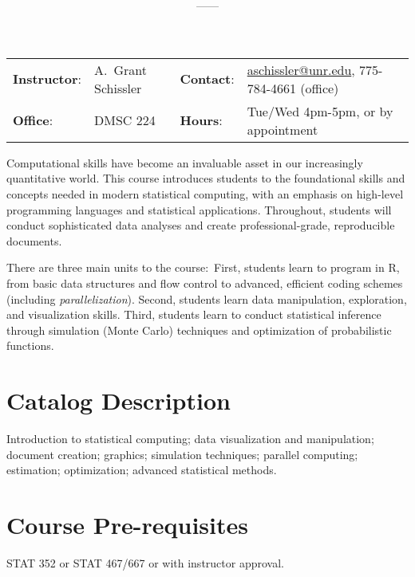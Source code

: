 \documentclass[11pt,onecolumn]{article}
\title{\textbf{\coursename}}
\author{{\semester}---{\roomnumb}---{\classtimes}}
\date{}
\makeatletter
\newcommand{\myname}{A.~Grant Schissler}
\newcommand{\myemail}{aschissler@unr.edu}
\newcommand{\office}{DMSC 224}
\newcommand{\officehours}{Tue/Wed 4pm-5pm, or by appointment}
\makeatother
\begin{document}
\maketitle

\vspace{-0.25in}
\noindent\makebox[\linewidth]{\rule{\textwidth}{1pt}}

\begin{center}
\begin{tabular}{llll}
\textbf{Instructor}:&\myname & \textbf{Contact}:&\href{mailto:\myemail}{\myemail}, 775-784-4661 (office)\\
\textbf{Office}:&\office & \textbf{Hours}:&\officehours\\
\end{tabular}
\end{center}

Computational skills have become an invaluable asset in our increasingly quantitative world. This course introduces students to the foundational skills and concepts needed in modern statistical computing, with an emphasis on high-level programming languages and statistical applications. Throughout, students will conduct sophisticated data analyses and create professional-grade, reproducible documents.

There are three main units to the course:~First, students learn to program in R, from basic data structures and flow control to advanced, efficient coding schemes (including \textit{parallelization}). Second, students learn data manipulation, exploration, and visualization skills. Third, students learn to conduct statistical inference through simulation (Monte Carlo) techniques and optimization of probabilistic functions.

\section*{Catalog Description}
Introduction to statistical computing; data visualization and manipulation; document creation; graphics; simulation techniques; parallel computing; estimation; optimization; advanced statistical methods.

\section*{Course Pre-requisites}
STAT 352 or STAT 467/667 or with instructor approval.
\end{document}
